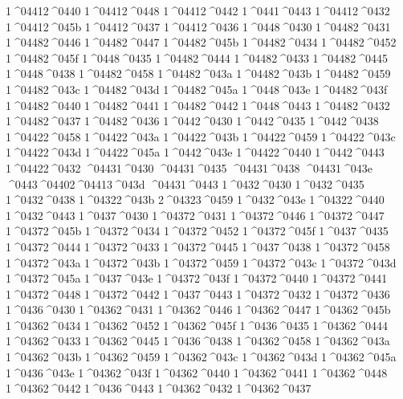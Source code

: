 {1^^^^04412^^^^0440
1^^^^04412^^^^0448
1^^^^04412^^^^0442
1^^^^0441^^^^0443
1^^^^04412^^^^0432
1^^^^04412^^^^045b
1^^^^04412^^^^0437
1^^^^04412^^^^0436
1^^^^0448^^^^0430
1^^^^04482^^^^0431
1^^^^04482^^^^0446
1^^^^04482^^^^0447
1^^^^04482^^^^045b
1^^^^04482^^^^0434
1^^^^04482^^^^0452
1^^^^04482^^^^045f
1^^^^0448^^^^0435
1^^^^04482^^^^0444
1^^^^04482^^^^0433
1^^^^04482^^^^0445
1^^^^0448^^^^0438
1^^^^04482^^^^0458
1^^^^04482^^^^043a
1^^^^04482^^^^043b
1^^^^04482^^^^0459
1^^^^04482^^^^043c
1^^^^04482^^^^043d
1^^^^04482^^^^045a
1^^^^0448^^^^043e
1^^^^04482^^^^043f
1^^^^04482^^^^0440
1^^^^04482^^^^0441
1^^^^04482^^^^0442
1^^^^0448^^^^0443
1^^^^04482^^^^0432
1^^^^04482^^^^0437
1^^^^04482^^^^0436
1^^^^0442^^^^0430
1^^^^0442^^^^0435
1^^^^0442^^^^0438
1^^^^04422^^^^0458
1^^^^04422^^^^043a
1^^^^04422^^^^043b
1^^^^04422^^^^0459
1^^^^04422^^^^043c
1^^^^04422^^^^043d
1^^^^04422^^^^045a
1^^^^0442^^^^043e
1^^^^04422^^^^0440
1^^^^0442^^^^0443
1^^^^04422^^^^0432
^^^^04431^^^^0430
^^^^04431^^^^0435
^^^^04431^^^^0438
^^^^04431^^^^043e
^^^^0443^^^^04402^^^^04413^^^^043d
^^^^04431^^^^0443
1^^^^0432^^^^0430
1^^^^0432^^^^0435
1^^^^0432^^^^0438
1^^^^04322^^^^043b
2^^^^04323^^^^0459
1^^^^0432^^^^043e
1^^^^04322^^^^0440
1^^^^0432^^^^0443
1^^^^0437^^^^0430
1^^^^04372^^^^0431
1^^^^04372^^^^0446
1^^^^04372^^^^0447
1^^^^04372^^^^045b
1^^^^04372^^^^0434
1^^^^04372^^^^0452
1^^^^04372^^^^045f
1^^^^0437^^^^0435
1^^^^04372^^^^0444
1^^^^04372^^^^0433
1^^^^04372^^^^0445
1^^^^0437^^^^0438
1^^^^04372^^^^0458
1^^^^04372^^^^043a
1^^^^04372^^^^043b
1^^^^04372^^^^0459
1^^^^04372^^^^043c
1^^^^04372^^^^043d
1^^^^04372^^^^045a
1^^^^0437^^^^043e
1^^^^04372^^^^043f
1^^^^04372^^^^0440
1^^^^04372^^^^0441
1^^^^04372^^^^0448
1^^^^04372^^^^0442
1^^^^0437^^^^0443
1^^^^04372^^^^0432
1^^^^04372^^^^0436
1^^^^0436^^^^0430
1^^^^04362^^^^0431
1^^^^04362^^^^0446
1^^^^04362^^^^0447
1^^^^04362^^^^045b
1^^^^04362^^^^0434
1^^^^04362^^^^0452
1^^^^04362^^^^045f
1^^^^0436^^^^0435
1^^^^04362^^^^0444
1^^^^04362^^^^0433
1^^^^04362^^^^0445
1^^^^0436^^^^0438
1^^^^04362^^^^0458
1^^^^04362^^^^043a
1^^^^04362^^^^043b
1^^^^04362^^^^0459
1^^^^04362^^^^043c
1^^^^04362^^^^043d
1^^^^04362^^^^045a
1^^^^0436^^^^043e
1^^^^04362^^^^043f
1^^^^04362^^^^0440
1^^^^04362^^^^0441
1^^^^04362^^^^0448
1^^^^04362^^^^0442
1^^^^0436^^^^0443
1^^^^04362^^^^0432
1^^^^04362^^^^0437
}
 

